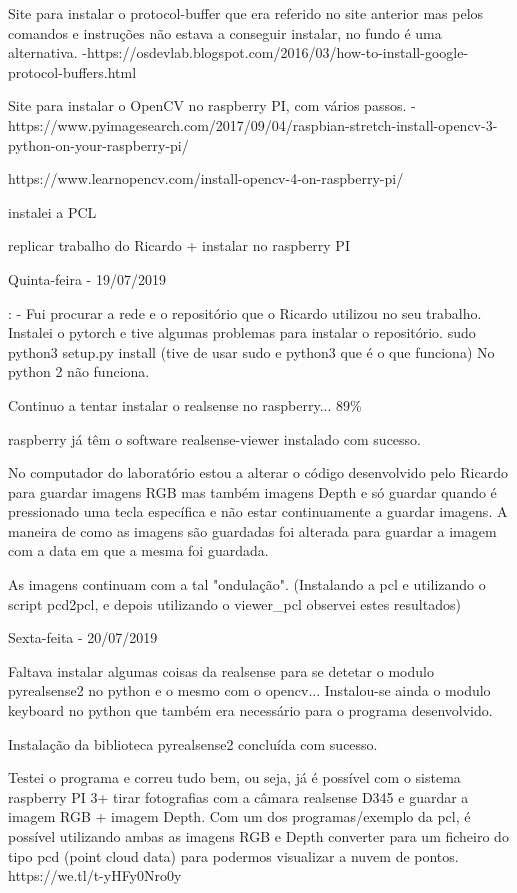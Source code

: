     Site para instalar o protocol-buffer que era referido no site anterior mas pelos comandos e instruções não estava a conseguir instalar, no fundo é uma alternativa.
    -https://osdevlab.blogspot.com/2016/03/how-to-install-google-protocol-buffers.html
    
    Site para instalar o OpenCV no raspberry PI, com vários passos.
    -https://www.pyimagesearch.com/2017/09/04/raspbian-stretch-install-opencv-3-python-on-your-raspberry-pi/

    https://www.learnopencv.com/install-opencv-4-on-raspberry-pi/


    instalei a PCL

    replicar trabalho do Ricardo + instalar no raspberry PI
    
    
    \bigskip
    
    Quinta-feira - 19/07/2019
    
    : - Fui procurar a rede e o repositório que o Ricardo utilizou no seu trabalho. Instalei o pytorch e tive algumas problemas para instalar o repositório. 
    sudo python3 setup.py install (tive de usar sudo e python3 que é o que funciona) No python 2 não funciona.
    
    Continuo a tentar instalar o realsense no raspberry... 89\%
    
    raspberry já têm o software realsense-viewer instalado com sucesso.
    
    No computador do laboratório estou a alterar o código desenvolvido pelo Ricardo para guardar imagens RGB mas também imagens Depth e só guardar quando é pressionado uma tecla específica e não estar continuamente a guardar imagens. A maneira de como as imagens são guardadas foi alterada para guardar a imagem com a data em que a mesma foi guardada.
    
    As imagens continuam com a tal "ondulação". (Instalando a pcl e utilizando o script pcd2pcl, e depois utilizando o viewer\_pcl observei estes resultados)
    
    \bigskip
    
    Sexta-feita - 20/07/2019
    
    Faltava instalar algumas coisas da realsense para se detetar o modulo pyrealsense2 no python e o mesmo com o opencv... Instalou-se ainda o modulo keyboard no python que também era necessário para o programa desenvolvido. 
    
    Instalação da biblioteca pyrealsense2 concluída com sucesso.
    
    Testei o programa e correu tudo bem, ou seja, já é possível com o sistema raspberry PI 3+ tirar fotografias com a câmara realsense D345 e guardar a imagem RGB + imagem Depth. Com um dos programas/exemplo da pcl, é possível utilizando ambas as imagens RGB e Depth converter para um ficheiro do tipo pcd (point cloud data) para podermos visualizar a nuvem de pontos.
    https://we.tl/t-yHFy0Nro0y
    

